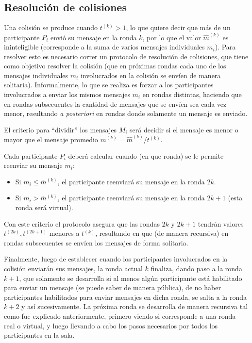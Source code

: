 \subsection{Resolución de colisiones}

Una colisión se produce cuando $t^{(k)} > 1$, lo que quiere decir que más de un 
participante $P_i$ envió su mensaje en la ronda $k$, por lo que el valor $\hat{m}^{(k)}$ 
es ininteligible (corresponde a la suma de varios mensajes individuales $m_i$). Para resolver 
esto es necesario correr un protocolo de resolución de colisiones, que tiene como objetivo 
resolver la colisión (que en próximas rondas cada uno de los mensajes individuales $m_i$ 
involucrados en la colisión se envíen de manera solitaria). Informalmente, lo que se realiza 
es forzar a los participantes involucrados a enviar los mismos mensajes $m_i$ en rondas 
distintas, haciendo que en rondas subsecuentes la cantidad de mensajes que se envíen sea 
cada vez menor, resultando \emph{a posteriori} en rondas donde solamente un mensaje es enviado.

El criterio para ``dividir'' los mensajes $M_i$ será decidir si el mensaje es menor o mayor que 
el mensaje promedio $\overline{m}^{(k)} = \hat{m}^{(k)} / t^{(k)}$.

Cada participante $P_i$ deberá calcular cuando (en que ronda) se le permite reenviar su mensaje $m_i$:
\begin{itemize}
    \item Si $m_i \leq \overline{m}^{(k)}$, el participante reenviará su mensaje en la ronda $2k$.
    \item Si $m_i > \overline{m}^{(k)}$, el participante reenviará su mensaje en la ronda $2k + 1$ 
    (esta ronda será virtual).
\end{itemize}

Con este criterio el protocolo asegura que las rondas $2k$ y $2k + 1$ tendrán valores 
$t^{(2k)}, t^{(2k + 1)}$ menores a $t^{(k)}$, resultando en que (de manera recursiva) en rondas 
subsecuentes se envíen los mensajes de forma solitaria.

Finalmente, luego de establecer cuando los participantes involucrados en la colisión enviarán 
sus mensajes, la ronda actual $k$ finaliza, dando paso a la ronda $k+1$, que solamente se 
desarrolla si al menos algún participante está habilitado para enviar un mensaje (se puede 
saber de manera pública), de no haber participantes habilitados para enviar mensajes en dicha 
ronda, se salta a la ronda $k+2$ y así sucesivamente. La próxima ronda se desarrolla de manera 
recursiva tal como fue explicado anteriormente, primero viendo si corresponde a una ronda real 
o virtual, y luego llevando a cabo los pasos necesarios por todos los participantes en la sala.